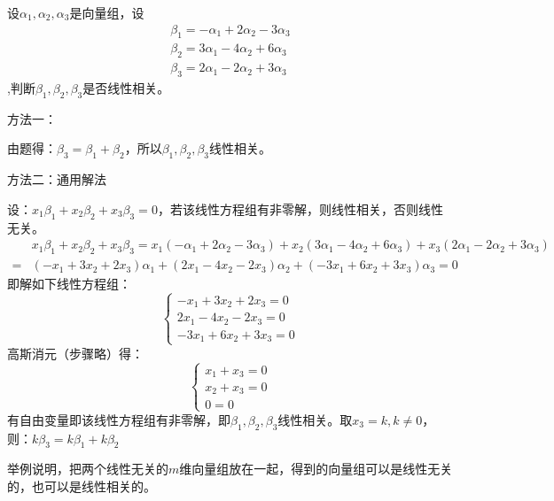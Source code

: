 \documentclass[a4paper]{report}
\begin{document}
\EX 设$\alpha_1,\alpha_2,\alpha_3$是向量组，设
\begin{gather*}
  \beta_1=-\alpha_1+2\alpha_2-3\alpha_3 \\
  \beta_2=3\alpha_1-4\alpha_2+6\alpha_3 \\
  \beta_3=2\alpha_1-2\alpha_2+3\alpha_3
\end{gather*},判断$\beta_1,\beta_2,\beta_3$是否线性相关。

\begin{jie}
方法一：

由题得：$\beta_3=\beta_1+\beta_2$，所以$\beta_1,\beta_2,\beta_3$线性相关。

方法二：通用解法

设：$x_1\beta_1+x_2\beta_2+x_3\beta_3=0$，若该线性方程组有非零解，则线性相关，否则线性无关。
\begin{align*}
&x_1\beta_1+x_2\beta_2+x_3\beta_3=x_1(-\alpha_1+2\alpha_2-3\alpha_3)+x_2(3\alpha_1-4\alpha_2+6\alpha_3)+x_3(2\alpha_1-2\alpha_2+3\alpha_3)\\
=&(-x_1+3x_2+2x_3)\alpha_1+(2x_1-4x_2-2x_3)\alpha_2+(-3x_1+6x_2+3x_3)\alpha_3=0
\end{align*}
即解如下线性方程组：
\begin{equation*}
\begin{cases}
-x_1+3x_2+2x_3=0\\
2x_1-4x_2-2x_3=0\\
-3x_1+6x_2+3x_3=0
\end{cases}
\end{equation*}
高斯消元（步骤略）得：
\begin{equation*}
\begin{cases}
x_1+x_3=0\\
x_2+x_3=0\\
0=0
\end{cases}
\end{equation*}
有自由变量即该线性方程组有非零解，即$\beta_1,\beta_2,\beta_3$线性相关。取$x_3=k,k\neq 0$，则：$k\beta_3=k\beta_1+k\beta_2$
\end{jie}

\EX 举例说明，把两个线性无关的$m$维向量组放在一起，得到的向量组可以是线性无关的，也可以是线性相关的。
\end{document}
